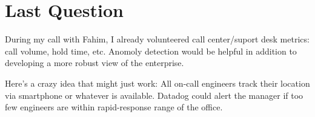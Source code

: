 \documentclass[11pt]{article}
\begin{document}
    \section{Last Question}\label{last-question}

    During my call with Fahim, I already volunteered call center/suport desk
metrics: call volume, hold time, etc. Anomoly detection would be helpful
in addition to developing a more robust view of the enterprise.

Here's a crazy idea that might just work: All on-call engineers track
their location via smartphone or whatever is available. Datadog could
alert the manager if too few engineers are within rapid-response range
of the office.


    
    
    
    
\end{document}
